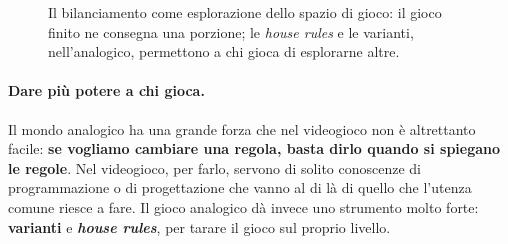\begin{figure}[htbp]
\centering
{}
\caption{Il bilanciamento come esplorazione dello spazio di gioco: il gioco finito ne
consegna una porzione; le \emph{house rules} e le varianti, nell'analogico, permettono a chi
gioca di esplorarne altre.}
\label{a14:fig:spazio}
\end{figure}

\paragraph{Dare più potere a chi gioca.} Il mondo analogico ha una grande forza che nel
videogioco non è altrettanto facile: \textbf{se vogliamo cambiare una regola, basta dirlo
quando si spiegano le regole}. Nel videogioco, per farlo, servono di solito conoscenze di
programmazione o di progettazione che vanno al di là di quello che l'utenza comune riesce a
fare. Il gioco analogico dà invece uno strumento molto forte: \textbf{varianti} e
\textbf{\emph{house rules}}, per tarare il gioco sul proprio livello.

